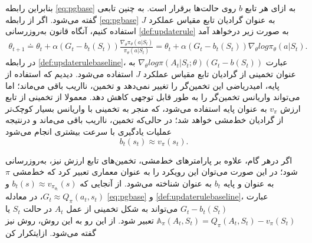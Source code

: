 بنابراین رابطه 
\ref{eq:pgbase}
به ازای هر تابع $b$ روی حالت‌ها برقرار است. به چنین تابعی 
\textit{}
 گفته می‌شود. اگر از رابطه
  \ref{eq:pgbase}
  به عنوان گرادیان تابع مقیاس عملکرد $J$ استفاده کنیم، آنگاه قانون به‌روزرسانی 
  \ref{def:updaterule}
  به صورت زیر درخواهد آمد
\begin{align}
\theta_{t+1} \doteq \theta_t + \alpha (G_t - b_t(S_t)) \frac{\nabla_\theta \pi_\theta (a|S_t)}{\pi_\theta (a|S_t)} = \theta_t + \alpha (G_t- b_t(S_t)) \nabla_\theta log \pi_\theta (a|S_t).
\label{def:updaterulebaseline}
\end{align}
در رابطه 
\ref{def:updaterulebaseline}،
عبارت 
$\nabla_\theta  log  \pi(A_t|S_t;\theta) (G_t - b(S_t))$
به عنوان تخمینی از گرادیان تابع مقیاس عملکرد $J$ استفاده می‌شود. دیدیم که استفاده از پایه، امیدریاضی این تخمین‌گر را  تغییر نمی‌دهد و تخمین، نااریب باقی می‌ماند؛ اما می‌تواند واریانس تخمین‌گر را به طور قابل توجهی کاهش دهد. معمولا از تخمینی از تابع ارزش $v_\pi$ به عنوان پایه استفاده می‌شود،
که منجر به تخمینی با واریانس بسیار کوچک‌تر از گرادیان خط‌مشی خواهد شد؛ در حالی‌که تخمین، نااریب باقی می‌ماند و درنتیجه عملیات یادگیری با سرعت بیشتری انجام می‌شود
$$b_t(s_t) \approx v_\pi (s_t).$$

اگر درهر گام، علاوه بر پارامترهای خط‌مشی، تخمین‌های تابع ارزش نیز، به‌روزرسانی شود؛  در این صورت می‌توان این رویکرد را به عنوان معماری 
\textit{}
 تعبیر کرد که خط‌مشی $\pi$  به عنوان  و پایه $b_t$ به عنوان   شناخته می‌شود.
از آنجایی که
$b_t(s) \approx v_{\pi_{\theta_t}}(s)$
و
$G_t \approx Q_\pi (a_t, s_t)$،
در معادله 
\ref{eq:pgbase} و
\ref{def:updaterulebaseline}،
عبارت
$G_t - b_t(S_t)$
می‌تواند به شکل تخمینی از
\textit{}
 عمل $A_t$ در حالت $S_t$ یا 
$\mathbb{A}_\pi(A_t,S_t)=Q_\pi(A_t,S_t)-v_\pi(S_t)$
 تعبیر شود. از این رو به این روش، روش 
\textit{
}
نیز گفته می‌شود.
‌ازای{تکرار کن}

